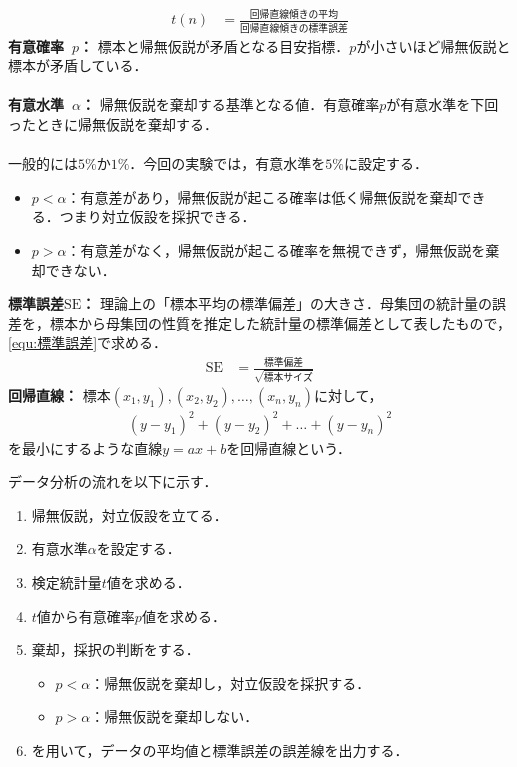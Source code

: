 \begin{oframed}
    \begin{align}
        t(n) & = \frac{\textrm{回帰直線傾きの平均}}{\textrm{回帰直線傾きの標準誤差}}\label{equ:t値}
    \end{align}
    \textbf{有意確率\ \(p\)：} 標本と帰無仮説が矛盾となる目安指標．\(p\)が小さいほど帰無仮説と標本が矛盾している．\\ \\
    \textbf{有意水準\ \(\alpha\)：} 帰無仮説を棄却する基準となる値．有意確率\(p\)が有意水準を下回ったときに帰無仮説を棄却する．\\ \\
    一般的には\(5\%\)か\(1\%\)．今回の実験では，有意水準を\(5\%\)に設定する．
    \begin{itemize}
        \item \(p<\alpha\)：有意差があり，帰無仮説が起こる確率は低く帰無仮説を棄却できる．つまり対立仮設を採択できる．
        \item \(p>\alpha\)：有意差がなく，帰無仮説が起こる確率を無視できず，帰無仮説を棄却できない．
    \end{itemize}
    \textbf{標準誤差\(\textrm{SE}\)：} 理論上の「標本平均の標準偏差」の大きさ．母集団の統計量の誤差を，標本から母集団の性質を推定した統計量の標準偏差として表したもので，\eqref{equ:標準誤差}で求める．
    \begin{align}
        \textrm{SE} & =\frac{\textrm{標準偏差}}{\sqrt{標本サイズ}}\label{equ:標準誤差}
    \end{align}
    \textbf{回帰直線：} 標本\((x_1,y_1),(x_2,y_2),\dots ,(x_n,y_n)\)に対して，
    \begin{align*}
        (y-y_1)^2+(y-y_2)^2+\dots +(y-y_n)^2
    \end{align*}
    を最小にするような直線\(y=ax+b\)を回帰直線という．\\
    \hfill\cite[p.168, p.187, p.200\ -\ p.205]{Pythonで学ぶあたらしい統計学の教科書}
\end{oframed}
データ分析の流れを以下に示す．
\begin{multicols}{2}
    \begin{enumerate}
        \item 帰無仮説，対立仮設を立てる．
        \item 有意水準\(\alpha\)を設定する．
        \item 検定統計量\(t\)値を求める．
        \item \(t\)値から有意確率\(p\)値を求める．
        \item 棄却，採択の判断をする．
              \begin{itemize}
                  \item \(p<\alpha\)：帰無仮説を棄却し，対立仮設を採択する．
                  \item \(p>\alpha\)：帰無仮説を棄却しない．
              \end{itemize}
        \item \matlab を用いて，データの平均値と標準誤差の誤差線を出力する．
    \end{enumerate}
\end{multicols}
